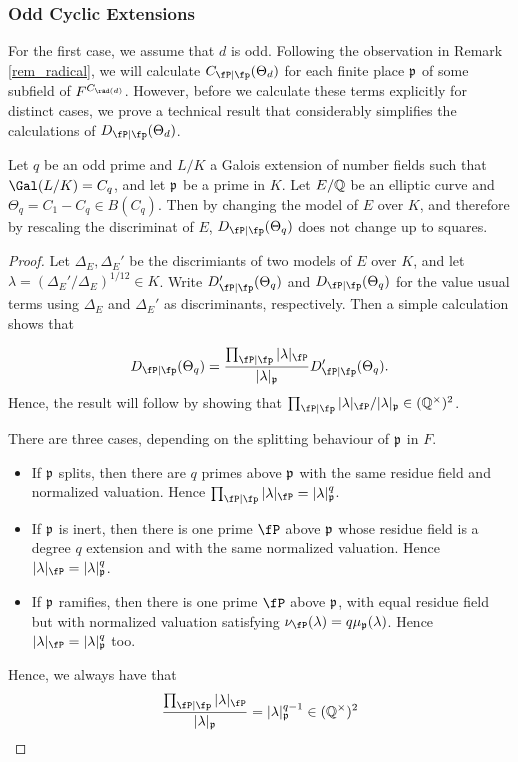 
\subsubsection{Odd Cyclic Extensions} \label{case_Cp}

For the first case, we assume that $d$ is odd. Following the observation in Remark \ref{rem_radical}, we will calculate $\Cp(\Theta_d)$ for each finite place $\mathfrak{p}$ of some subfield of $F^{C_{\rad(d)}}$. However, before we calculate these terms explicitly for distinct cases, we prove a technical result that considerably simplifies the calculations of $\Dp(\Theta_d)$.

\begin{lemma}
    Let $q$ be an odd prime and $L/K$ a Galois extension of number fields such that $\Gal(L/K)=C_q$, and let $\mathfrak{p}$ be a prime in $K$. Let $E/\mathbb{Q}$ be an elliptic curve and $\Theta_q=C_1-C_q\in B(C_q)$. Then by changing the model of $E$ over $K$, and therefore by rescaling the discriminat of $E$, $\Dp(\Theta_q)$ does not change up to squares.
\end{lemma}
\begin{proof}
    Let $\Delta_E,\Delta_E'$ be the discrimiants of two models of $E$ over $K$, and let $\lambda=(\Delta_E'/\Delta_E)^{1/12}\in K$. Write $\Dp'(\Theta_q)$ and $\Dp(\Theta_q)$ for the value usual terms using $\Delta_E$ and $\Delta_E'$ as discriminants, respectively. Then a simple calculation shows that
    
    $$\Dp(\Theta_q)=\frac{\prod_{\fP\mid\fp}|\lambda|_\fP}{|\lambda|_\pp}\Dp'(\Theta_q).$$
    Hence, the result will follow by showing that $\prod_{\fP\mid\fp}|\lambda|_\fP/|\lambda|_\pp\in\QQss$. 
    
    There are three cases, depending on the splitting behaviour of $\mathfrak{p}$ in $F$. 
    \begin{itemize}
        \item If $\mathfrak{p}$ splits, then there are $q$ primes above $\mathfrak{p}$ with the same residue field and normalized valuation. Hence $\prod_{\fP\mid\fp}|\lambda|_\fP=|\lambda|_\pp^q$.
        \item If $\mathfrak{p}$ is inert, then there is one prime $\fP$ above $\mathfrak{p}$ whose residue field is a degree $q$ extension and with the same normalized valuation. Hence $|\lambda|_\fP=|\lambda|_\pp^q$.
        \item If $\mathfrak{p}$ ramifies, then there is one prime $\fP$ above $\mathfrak{p}$, with equal residue field but with normalized valuation satisfying $\nu_\fP(\lambda)=q\mu_\pp(\lambda)$. Hence $|\lambda|_\fP=|\lambda|_\pp^q$ too.
    \end{itemize}
    Hence, we always have that 
    $$\frac{\prod_{\fP\mid\fp}|\lambda|_\fP}{|\lambda|_\pp}=|\lambda|_\pp^{q-1}\in\QQss$$
\end{proof}

